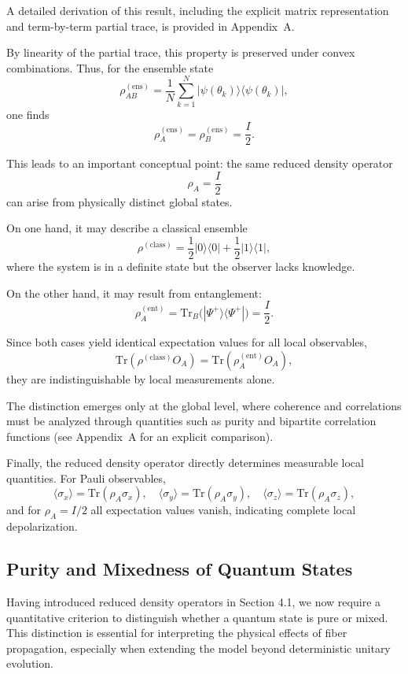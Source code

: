 \documentclass[a4paper]{article}
\begin{document}
A detailed derivation of this result, including the explicit matrix representation and term-by-term partial trace, is provided in Appendix~A.

By linearity of the partial trace, this property is preserved under convex combinations. Thus, for the ensemble state
\[
\rho_{AB}^{(\mathrm{ens})}
=
\frac{1}{N}
\sum_{k=1}^{N}
|\psi(\theta_k)\rangle\langle\psi(\theta_k)|,
\]
one finds
\[
\rho_A^{(\mathrm{ens})} = \rho_B^{(\mathrm{ens})} = \frac{I}{2}.
\]

This leads to an important conceptual point: the same reduced density operator
\[
\rho_A = \frac{I}{2}
\]
can arise from physically distinct global states.

On one hand, it may describe a classical ensemble
\[
\rho^{(\mathrm{class})}
=
\frac{1}{2}|0\rangle\langle 0|
+
\frac{1}{2}|1\rangle\langle 1|,
\]
where the system is in a definite state but the observer lacks knowledge.

On the other hand, it may result from entanglement:
\[
\rho_A^{(\mathrm{ent})}
=
\mathrm{Tr}_B\big(|\Psi^+\rangle\langle\Psi^+|\big)
=
\frac{I}{2}.
\]

Since both cases yield identical expectation values for all local observables,
\[
\mathrm{Tr}(\rho^{(\mathrm{class})} O_A)
=
\mathrm{Tr}(\rho_A^{(\mathrm{ent})} O_A),
\]
they are indistinguishable by local measurements alone.

The distinction emerges only at the global level, where coherence and correlations must be analyzed through quantities such as purity and bipartite correlation functions (see Appendix~A for an explicit comparison).

Finally, the reduced density operator directly determines measurable local quantities. For Pauli observables,
\[
\langle \sigma_x \rangle = \mathrm{Tr}(\rho_A \sigma_x), \quad
\langle \sigma_y \rangle = \mathrm{Tr}(\rho_A \sigma_y), \quad
\langle \sigma_z \rangle = \mathrm{Tr}(\rho_A \sigma_z),
\]
and for $\rho_A = I/2$ all expectation values vanish, indicating complete local depolarization.

\subsection{Purity and Mixedness of Quantum States}

Having introduced reduced density operators in Section 4.1, we now require a quantitative criterion to distinguish whether a quantum state is pure or mixed. This distinction is essential for interpreting the physical effects of fiber propagation, especially when extending the model beyond deterministic unitary evolution.
\end{document}

